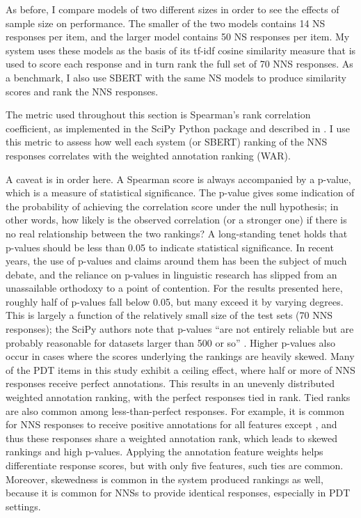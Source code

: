 As before, I compare models of two different sizes in order to see the effects of sample size on performance. The smaller of the two models contains 14 NS responses per item, and the larger model contains 50 NS responses per item. My system uses these models as the basis of its tf-idf cosine similarity measure that is used to score each response and in turn rank the full set of 70 NNS responses. As a benchmark, I also use SBERT with the same NS models to produce similarity scores and rank the NNS responses.

The metric used throughout this section is Spearman's rank correlation coefficient, as implemented in the SciPy Python package \cite{2020scipy} and described in \citet{zwillinger1999crc}. I use this metric to assess how well each system (or SBERT) ranking of the NNS responses correlates with the weighted annotation ranking (WAR).

A caveat is in order here. A Spearman score is always accompanied by a p-value, which is a measure of statistical significance. The p-value gives some indication of the probability of achieving the correlation score under the null hypothesis; in other words, how likely is the observed correlation (or a stronger one) if there is no real relationship between the two rankings? A long-standing tenet holds that p-values should be less than 0.05 to indicate statistical significance. In recent years, the use of p-values and claims around them has been the subject of much debate, and the reliance on p-values in linguistic research has slipped from an unassailable orthodoxy to a point of contention. For the results presented here, roughly half of p-values fall below 0.05, but many exceed it by varying degrees. This is largely a function of the relatively small size of the test sets (70 NNS responses); the SciPy authors note that p-values ``are not entirely reliable but are probably reasonable for datasets larger than 500 or so'' \cite{2020scipy}. Higher p-values also occur in cases where the scores underlying the rankings are heavily skewed. Many of the PDT items in this study exhibit a ceiling effect, where half or more of NNS responses receive perfect annotations. This results in an unevenly distributed weighted annotation ranking, with the perfect responses tied in rank. Tied ranks are also common among less-than-perfect responses. For example, it is common for NNS responses to receive positive annotations for all features except , and thus these responses share a weighted annotation rank, which leads to skewed rankings and high p-values. Applying the annotation feature weights helps differentiate response scores, but with only five features, such ties are common. Moreover, skewedness is common in the system produced rankings as well, because it is common for NNSs to provide identical responses, especially in  PDT settings.

